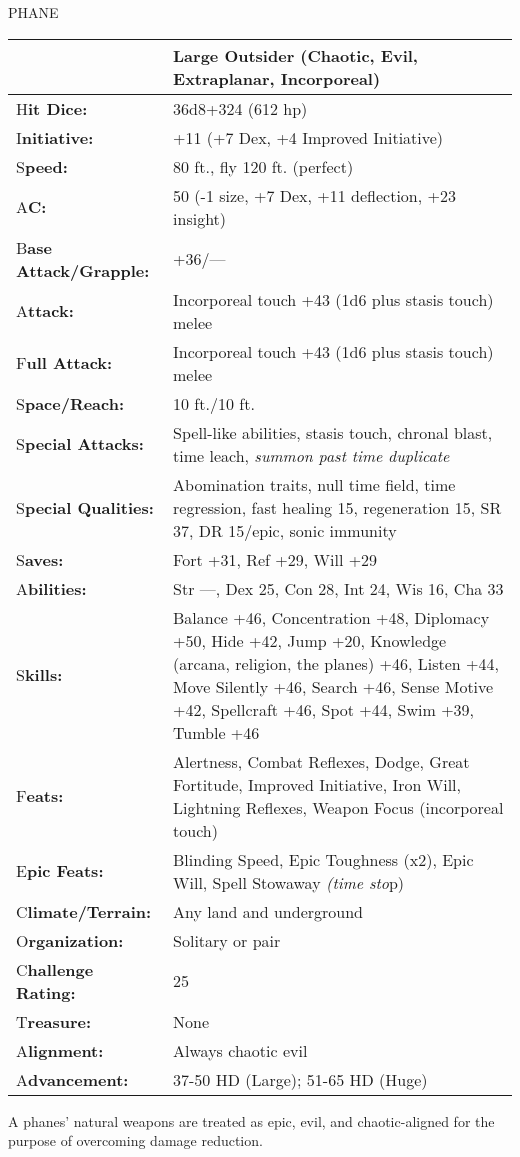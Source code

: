 \documentclass{article}
\begin{document}
\vspace{12pt}
{\LARGE{}PHANE }

\begin{tabular}{|>{\raggedright}p{66pt}|>{\raggedright}p{259pt}|}
\hline
  & Large Outsider (Chaotic, Evil, Extraplanar, Incorporeal) \tabularnewline
\hline
H\textbf{it Dice:} &  36d8+324 (612 hp) \tabularnewline
\hline
I\textbf{nitiative:} &  +11 (+7 Dex, +4 Improved Initiative) \tabularnewline
\hline
S\textbf{peed:} &  80 ft., fly 120 ft. (perfect) \tabularnewline
\hline
A\textbf{C:} &  50 (-1 size, +7 Dex, +11 deflection, +23 insight) \tabularnewline
\hline
B\textbf{ase Attack/Grapple:} &  +36/---\tabularnewline
\hline
A\textbf{ttack:} &  Incorporeal touch +43 (1d6 plus stasis touch) melee\tabularnewline
\hline
F\textbf{ull Attack:} &  Incorporeal touch +43 (1d6 plus stasis touch) melee\tabularnewline
\hline
S\textbf{pace/Reach:} &  10 ft./10 ft. \tabularnewline
\hline
S\textbf{pecial Attacks:} &  Spell-like abilities, stasis touch, chronal blast, 
time leach, \textit{summon past time duplicate }\tabularnewline
\hline
S\textbf{pecial Qualities:} &  Abomination traits, null time field, time regression, 
fast healing 15, regeneration 15, SR 37, DR 15/epic, sonic immunity \tabularnewline
\hline
S\textbf{aves:} &  Fort +31, Ref +29, Will +29 \tabularnewline
\hline
A\textbf{bilities:} &  Str ---, Dex 25, Con 28, Int 24, Wis 16, Cha 33 \tabularnewline
\hline
S\textbf{kills:} & Balance +46, Concentration +48, Diplomacy +50, Hide +42, Jump 
+20, Knowledge (arcana, religion, the planes) +46, Listen +44, Move Silently +46, 
Search +46, Sense Motive +42, Spellcraft +46, Spot +44, Swim +39, Tumble +46\tabularnewline
\hline
F\textbf{eats:} &  Alertness, Combat Reflexes, Dodge, Great Fortitude, Improved 
Initiative, Iron Will, Lightning Reflexes, Weapon Focus (incorporeal touch) \tabularnewline
\hline
E\textbf{pic Feats:} &  Blinding Speed, Epic Toughness (x2), Epic Will, Spell Stowaway 
\textit{(time sto}p)\tabularnewline
\hline
C\textbf{limate/Terrain:} &  Any land and underground \tabularnewline
\hline
O\textbf{rganization:} &  Solitary or pair \tabularnewline
\hline
C\textbf{hallenge Rating:} &  25 \tabularnewline
\hline
T\textbf{reasure:} &  None \tabularnewline
\hline
A\textbf{lignment:} &  Always chaotic evil \tabularnewline
\hline
A\textbf{dvancement:} &  37-50 HD (Large); 51-65 HD (Huge) \tabularnewline
\hline
\end{tabular}

A phanes' natural weapons are treated as epic, evil, and chaotic-aligned for the 
purpose of overcoming damage reduction.
\end{document}
